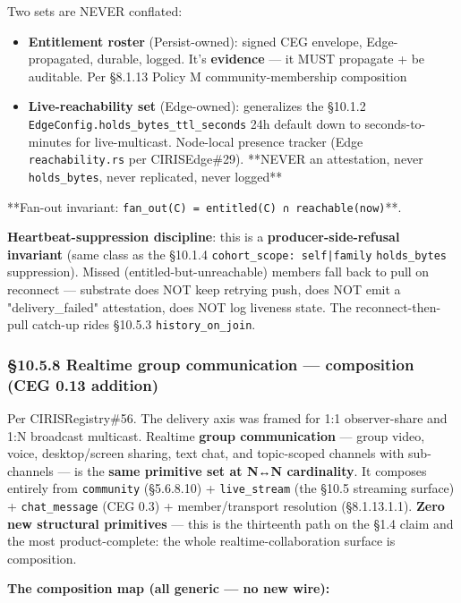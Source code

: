 \documentclass[10pt]{article}
\begin{document}
Two sets are NEVER conflated:


\begin{itemize}\setlength\itemsep{0pt}
\item \textbf{Entitlement roster} (Persist-owned): signed CEG envelope, Edge-propagated, durable, logged. It's \textbf{evidence} — it MUST propagate + be auditable. Per §8.1.13 Policy M community-membership composition
\item \textbf{Live-reachability set} (Edge-owned): generalizes the §10.1.2 \texttt{EdgeConfig.holds\_bytes\_ttl\_seconds} 24h default down to seconds-to-minutes for live-multicast. Node-local presence tracker (Edge \texttt{reachability.rs} per CIRISEdge\#29). **NEVER an attestation, never \texttt{holds\_bytes}, never replicated, never logged**
\end{itemize}


**Fan-out invariant: \texttt{fan\_out(C) = entitled(C) ∩ reachable(now)}**.


\textbf{Heartbeat-suppression discipline}: this is a \textbf{producer-side-refusal invariant} (same class as the §10.1.4 \texttt{cohort\_scope: self|family} \texttt{holds\_bytes} suppression). Missed (entitled-but-unreachable) members fall back to pull on reconnect — substrate does NOT keep retrying push, does NOT emit a "delivery\_failed" attestation, does NOT log liveness state. The reconnect-then-pull catch-up rides §10.5.3 \texttt{history\_on\_join}.


\subsubsection*{§10.5.8 Realtime group communication — composition (CEG 0.13 addition)}


Per CIRISRegistry\#56. The delivery axis was framed for 1:1 observer-share and 1:N broadcast multicast. Realtime \textbf{group communication} — group video, voice, desktop/screen sharing, text chat, and topic-scoped channels with sub-channels — is the \textbf{same primitive set at N↔N cardinality}. It composes entirely from \texttt{community} (§5.6.8.10) + \texttt{live\_stream} (the §10.5 streaming surface) + \texttt{chat\_message} (CEG 0.3) + member/transport resolution (§8.1.13.1.1). \textbf{Zero new structural primitives} — this is the thirteenth path on the §1.4 claim and the most product-complete: the whole realtime-collaboration surface is composition.


\textbf{The composition map (all generic — no new wire):}
\end{document}
